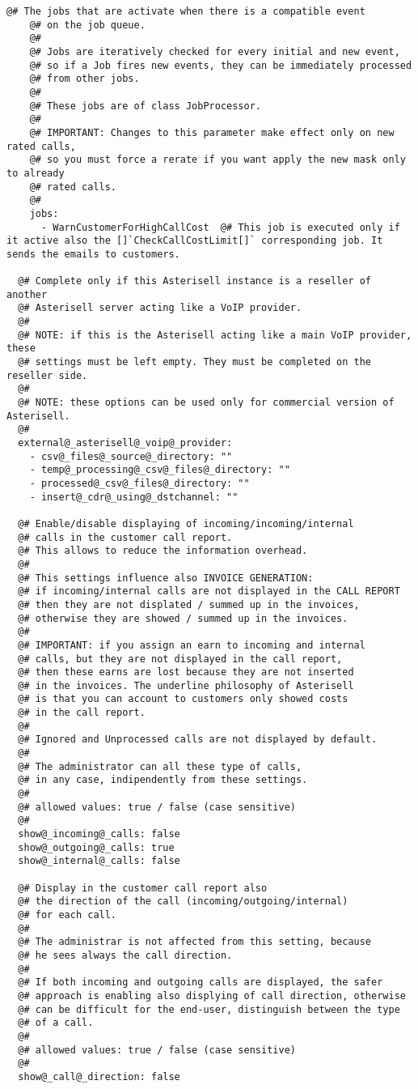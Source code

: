 \documentclass[letterpaper,10pt,english]{sphinxmanual}
\begin{document}
\begin{Verbatim}[commandchars=@\[\]]
    @# The jobs that are activate when there is a compatible event
    @# on the job queue.
    @#
    @# Jobs are iteratively checked for every initial and new event,
    @# so if a Job fires new events, they can be immediately processed
    @# from other jobs.
    @#
    @# These jobs are of class JobProcessor.
    @#
    @# IMPORTANT: Changes to this parameter make effect only on new rated calls,
    @# so you must force a rerate if you want apply the new mask only to already
    @# rated calls.
    @#
    jobs:
      - WarnCustomerForHighCallCost  @# This job is executed only if it active also the []`CheckCallCostLimit[]` corresponding job. It sends the emails to customers.

  @# Complete only if this Asterisell instance is a reseller of another
  @# Asterisell server acting like a VoIP provider.
  @# 
  @# NOTE: if this is the Asterisell acting like a main VoIP provider, these
  @# settings must be left empty. They must be completed on the reseller side.
  @#
  @# NOTE: these options can be used only for commercial version of Asterisell.
  @#
  external@_asterisell@_voip@_provider:
    - csv@_files@_source@_directory: ""
    - temp@_processing@_csv@_files@_directory: ""
    - processed@_csv@_files@_directory: ""
    - insert@_cdr@_using@_dstchannel: ""

  @# Enable/disable displaying of incoming/incoming/internal 
  @# calls in the customer call report.
  @# This allows to reduce the information overhead.
  @#
  @# This settings influence also INVOICE GENERATION:
  @# if incoming/internal calls are not displayed in the CALL REPORT
  @# then they are not displated / summed up in the invoices,
  @# otherwise they are showed / summed up in the invoices.
  @#
  @# IMPORTANT: if you assign an earn to incoming and internal 
  @# calls, but they are not displayed in the call report,
  @# then these earns are lost because they are not inserted
  @# in the invoices. The underline philosophy of Asterisell
  @# is that you can account to customers only showed costs
  @# in the call report.
  @#
  @# Ignored and Unprocessed calls are not displayed by default.
  @#
  @# The administrator can all these type of calls, 
  @# in any case, indipendently from these settings.
  @#
  @# allowed values: true / false (case sensitive)
  @#
  show@_incoming@_calls: false
  show@_outgoing@_calls: true
  show@_internal@_calls: false
  
  @# Display in the customer call report also 
  @# the direction of the call (incoming/outgoing/internal)
  @# for each call.
  @#
  @# The administrar is not affected from this setting, because 
  @# he sees always the call direction.
  @#
  @# If both incoming and outgoing calls are displayed, the safer
  @# approach is enabling also displying of call direction, otherwise
  @# can be difficult for the end-user, distinguish between the type 
  @# of a call.
  @#
  @# allowed values: true / false (case sensitive)
  @#
  show@_call@_direction: false


\end{Verbatim}
\end{document}
